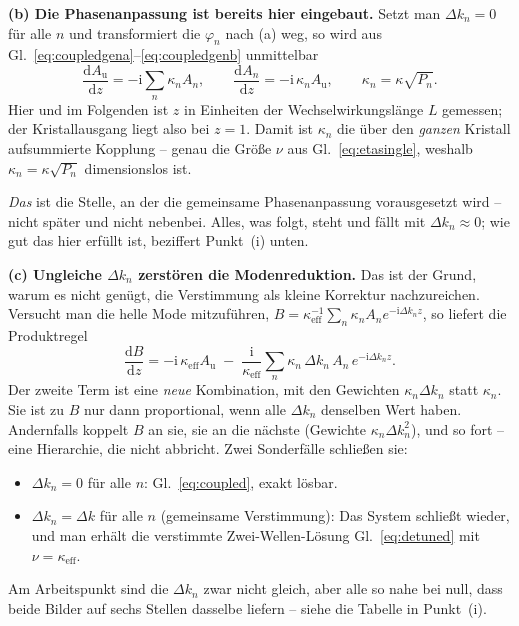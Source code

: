 \documentclass[11pt,a4paper]{article}
\begin{document}
\medskip
\noindent\textbf{(b) Die Phasenanpassung ist bereits hier eingebaut.} Setzt
man $\Delta k_n = 0$ für alle $n$ und transformiert die $\varphi_n$ nach (a)
weg, so wird aus Gl.~\eqref{eq:coupledgena}--\eqref{eq:coupledgenb}
unmittelbar
\begin{equation}
  \frac{\mathrm{d}A_\mathrm{u}}{\mathrm{d}z} = -\mathrm{i}\sum_n \kappa_n A_n ,
  \qquad
  \frac{\mathrm{d}A_n}{\mathrm{d}z} = -\mathrm{i}\,\kappa_n A_\mathrm{u} ,
  \qquad \kappa_n = \kappa\sqrt{P_n} .
  \label{eq:coupled}
\end{equation}
Hier und im Folgenden ist $z$ in Einheiten der Wechselwirkungslänge $L$
gemessen; der Kristallausgang liegt also bei $z=1$. Damit ist $\kappa_n$ die
über den \emph{ganzen} Kristall aufsummierte Kopplung -- genau die Größe
$\nu$ aus Gl.~\eqref{eq:etasingle}, weshalb $\kappa_n = \kappa\sqrt{P_n}$
dimensionslos ist.

\emph{Das} ist die Stelle, an der die gemeinsame Phasenanpassung
vorausgesetzt wird -- nicht später und nicht nebenbei. Alles, was folgt,
steht und fällt mit $\Delta k_n \approx 0$; wie gut das hier erfüllt ist,
beziffert Punkt~(i) unten.

\medskip
\noindent\textbf{(c) Ungleiche \boldmath$\Delta k_n$ zerstören die
Modenreduktion.} Das ist der Grund, warum es nicht genügt, die Verstimmung
als kleine Korrektur nachzureichen. Versucht man die helle Mode
mitzuführen, $B = \kappa_\mathrm{eff}^{-1}\sum_n \kappa_n A_n
e^{-\mathrm{i}\Delta k_n z}$, so liefert die Produktregel
\begin{equation}
  \frac{\mathrm{d}B}{\mathrm{d}z}
  = -\mathrm{i}\,\kappa_\mathrm{eff}A_\mathrm{u}
    \;-\;\frac{\mathrm{i}}{\kappa_\mathrm{eff}}
        \sum_n \kappa_n\,\Delta k_n\,A_n\,e^{-\mathrm{i}\Delta k_n z} .
\end{equation}
Der zweite Term ist eine \emph{neue} Kombination, mit den Gewichten
$\kappa_n\Delta k_n$ statt $\kappa_n$. Sie ist zu $B$ nur dann
proportional, wenn alle $\Delta k_n$ denselben Wert haben. Andernfalls
koppelt $B$ an sie, sie an die nächste (Gewichte $\kappa_n\Delta k_n^2$),
und so fort -- eine Hierarchie, die nicht abbricht. Zwei Sonderfälle
schließen sie:
\begin{itemize}\itemsep0.15em
  \item $\Delta k_n = 0$ für alle $n$: Gl.~\eqref{eq:coupled}, exakt lösbar.
  \item $\Delta k_n = \Delta k$ für alle $n$ (gemeinsame Verstimmung):
        Das System schließt wieder, und man erhält die verstimmte
        Zwei-Wellen-Lösung Gl.~\eqref{eq:detuned} mit
        $\nu = \kappa_\mathrm{eff}$.
\end{itemize}
Am Arbeitspunkt sind die $\Delta k_n$ zwar nicht gleich, aber alle so nahe
bei null, dass beide Bilder auf sechs Stellen dasselbe liefern -- siehe die
Tabelle in Punkt~(i).
\end{document}
